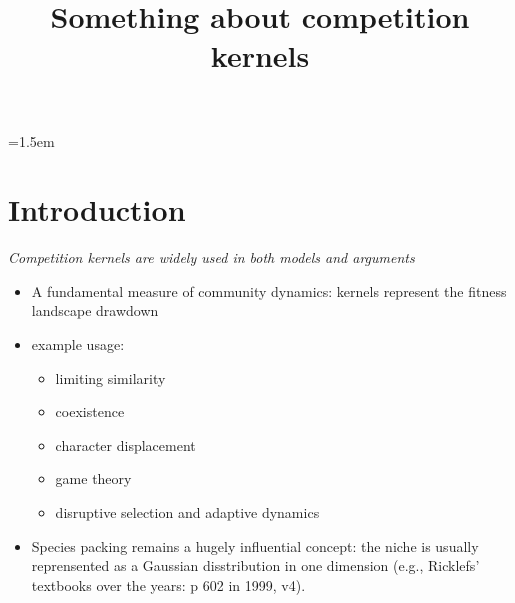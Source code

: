 \documentclass[a4paper,11pt]{article}
\title{Something about competition kernels}
\author{}
\date{}
\affiliation{}
\begin{document}

\parindent=1.5em
\addtolength{\parskip}{.3em}


\section{Introduction}

\textit{Competition kernels are widely used in both models and arguments}
\begin{itemize}
\item A fundamental measure of community dynamics: kernels represent
  the fitness landscape drawdown
\item example usage:
  \begin{itemize}
  \item limiting similarity \citet{MacArthur-1967}
  \item coexistence
  \item character displacement \citep[e.g.,][]{Taper-1985, Case-2000,
      Goldberg-2006}
  \item game theory \citep[e.g.,][]{Brown-1987, Brown-1987-140}
  \item disruptive selection and adaptive dynamics \citep{Dieckmann-1999}
  \end{itemize}
\item Species packing remains a hugely influential concept: the
  niche is usually reprensented as a Gaussian disstribution in one
  dimension (e.g., Ricklefs' textbooks over the years: p 602 in
  1999, v4).
\end{itemize}
\end{document}
